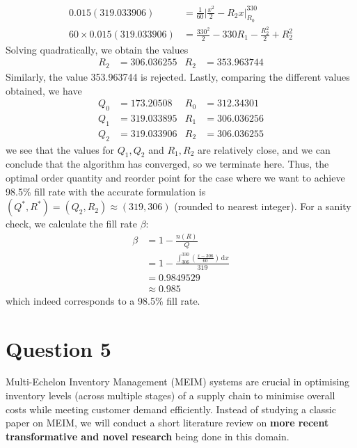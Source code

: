 \documentclass[12pt]{article}
\begin{document}
\begin{align*}
    0.015(319.033906) &= \frac{1}{60} \Big| \frac{x^{2}}{2} - R_{2}x \Big|^{330}_{R_{0}} \\ 
    60\times 0.015(319.033906) &= \frac{330^{2}}{2} - 330 R_{1} - \frac{R_{2}^{2}}{2} + R_{2}^{2} 
\end{align*} Solving quadratically, we obtain the values \begin{align*}
    R_{2} &= \mathbf{306.036255} & R_{2} &= 353.963744
\end{align*} Similarly, the value 353.963744 is rejected. Lastly, comparing the different values obtained, we have \begin{align*}
    Q_{0} &= 173.20508 & R_{0} &= 312.34301 \\ 
    Q_{1} &= 319.033895 & R_{1} &= 306.036256 \\ 
    Q_{2} &= 319.033906 & R_{2} &= 306.036255
\end{align*} we see that the values for $Q_{1}, Q_{2}$ and $R_{1}, R_{2}$ are relatively close, and we can conclude that the algorithm has converged, so we terminate here. Thus, the optimal order quantity and reorder point for the case where we want to achieve 98.5\% fill rate with the accurate formulation is $(Q^{*}, R^{*}) = (Q_{2}, R_{2}) \approx (319, 306)$ (rounded to nearest integer). For a sanity check, we calculate the fill rate $\beta$: \begin{align*}
    \beta &= 1- \frac{n(R)}{Q} \\ 
    &= 1- \frac{ \displaystyle\int_{306}^{330} \left( \frac{x-306}{60} \right) \, \mathrm{d}x}{319} \\ 
    &= 0.9849529 \\ 
    &\approx 0.985
\end{align*} which indeed corresponds to a 98.5\% fill rate. 

\newpage 

\section*{Question 5}


Multi-Echelon Inventory Management (MEIM) systems are crucial in optimising inventory levels (across multiple stages) of a supply chain to minimise overall costs while meeting customer demand efficiently. Instead of studying a classic paper on MEIM, we will conduct a short literature review on \textbf{more recent transformative and novel research} being done in this domain. \\
\end{document}
